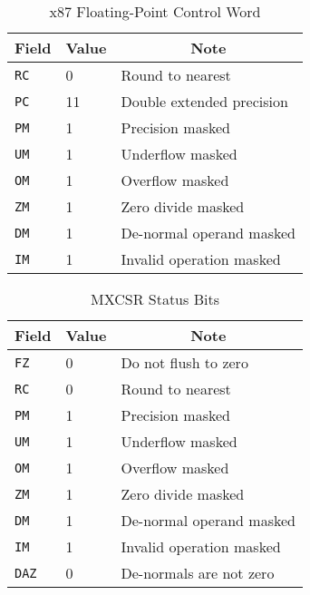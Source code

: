 \begin{table}[H]
\Hrule
  \caption{x87 Floating-Point Control Word}
  \label{x87-fpucw}
  \begin{center}
    \begin{tabular}[t]{l|l|l}
      \multicolumn{1}{c}{Field} & \multicolumn{1}{c}{Value}& \multicolumn{1}{c}{Note} \\
      \hline
      \texttt{RC} & 0 & Round to nearest\\
      \texttt{PC} & 11& Double extended precision\\
      \texttt{PM} & 1 & Precision masked\\
      \texttt{UM} & 1 & Underflow masked\\
      \texttt{OM} & 1 & Overflow masked\\
      \texttt{ZM} & 1 & Zero divide masked\\
      \texttt{DM} & 1 & De-normal operand masked\\
      \texttt{IM} & 1 & Invalid operation masked\\
    \end{tabular}
  \end{center}
\Hrule
\end{table}

\begin{table}[H]
\Hrule
  \caption{MXCSR Status Bits}
  \label{mxcsr-status}
  \begin{center}
    \begin{tabular}[t]{l|l|l}
      \multicolumn{1}{c}{Field} & \multicolumn{1}{c}{Value}& \multicolumn{1}{c}{Note} \\
      \hline
      \texttt{FZ}  & 0 & Do not flush to zero\\
      \texttt{RC}  & 0 & Round to nearest\\
      \texttt{PM}  & 1 & Precision masked\\
      \texttt{UM}  & 1 & Underflow masked\\
      \texttt{OM}  & 1 & Overflow masked\\
      \texttt{ZM}  & 1 & Zero divide masked\\
      \texttt{DM}  & 1 & De-normal operand masked\\
      \texttt{IM}  & 1 & Invalid operation masked\\
      \texttt{DAZ} & 0 & De-normals are not zero\\
    \end{tabular}
  \end{center}
\Hrule
\end{table}

